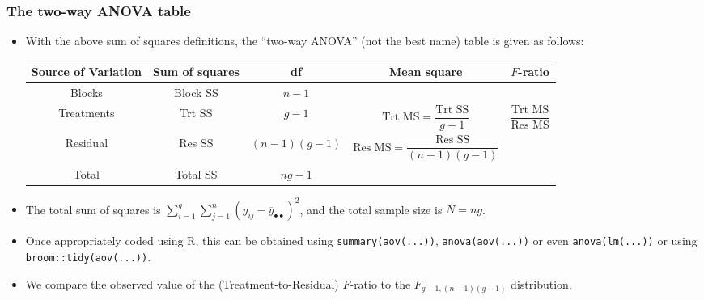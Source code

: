 \documentclass[a4paper]{article}\usepackage[]{graphicx}\usepackage[]{xcolor}
\begin{document}
\subsubsection{The two-way ANOVA table}
\begin{itemize}
	\item With the above sum of squares definitions, the ``two-way ANOVA'' (not the best name) table is given as follows:
	\begin{table}[H]
		\centering
		\begin{tabular}{@{}ccccc@{}}
		\toprule
		\textbf{Source of Variation} & \textbf{Sum of squares} & \textbf{df} & \textbf{Mean square} & \textbf{\( F \)-ratio} \\ \midrule
		Blocks     & Block SS & \( n-1        \) &  &  \\
		Treatments & Trt SS   & \( g-1        \) & \( \text{Trt MS} = \dfrac{\text{Trt SS}}{g-1} \) & \( \dfrac{\text{Trt MS}}{\text{Res MS}} \)  \\\addlinespace[0.5em]
		Residual   & Res SS   & \( (n-1)(g-1) \) & \( \text{Res MS} = \dfrac{\text{Res SS}}{(n-1)(g-1)} \) &  \\ \midrule
		Total      & Total SS & \( ng-1 \)       &  &  \\ \bottomrule
		\end{tabular}
	\end{table}
	\item The total sum of squares is \( \sum_{i=1}^g\sum_{j=1}^n(y_{ij}-\overline y_{\bullet\bullet})^2 \), and the total sample size is \( N = ng \).
	\item Once appropriately coded using R, this can be obtained using \lstinline|summary(aov(...))|, \lstinline|anova(aov(...))| or even \lstinline|anova(lm(...))| or using \lstinline|broom::tidy(aov(...))|.
	\item We compare the observed value of the (Treatment-to-Residual) \( F \)-ratio to the \( F_{g-1,(n-1)(g-1)} \) distribution.
\end{itemize}
\end{document}
